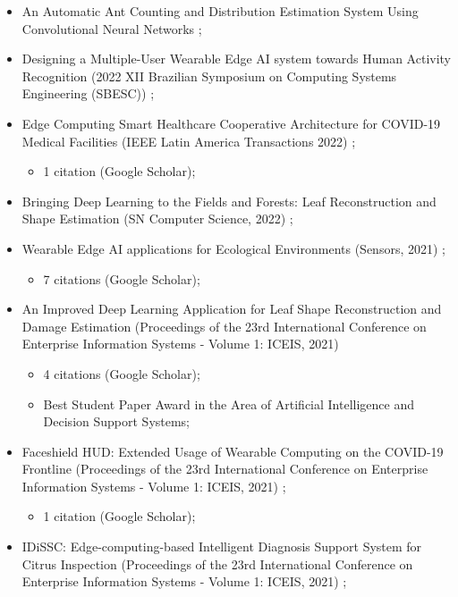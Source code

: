 \begin{itemize}
    \item An Automatic Ant Counting and Distribution Estimation System Using Convolutional Neural Networks \cite{Silva2023iceis};
    \item Designing a Multiple-User Wearable Edge AI system towards Human Activity Recognition (2022 XII Brazilian Symposium on Computing Systems Engineering (SBESC)) \cite{silva2022designing};
    \item Edge Computing Smart Healthcare Cooperative Architecture for COVID-19 Medical Facilities (IEEE Latin America Transactions 2022) \cite{silva2022edge};
    \begin{itemize}
        \item 1 citation (Google Scholar);
    \end{itemize}
    \item Bringing Deep Learning to the Fields and Forests: Leaf Reconstruction and Shape Estimation (SN Computer Science, 2022) \cite{silva2022bringing}; 
    \item Wearable Edge AI applications for Ecological Environments (Sensors, 2021) \cite{silva2021wearable};
    \begin{itemize}
        \item 7 citations (Google Scholar);
    \end{itemize}
    \item An Improved Deep Learning Application for Leaf Shape Reconstruction and Damage Estimation (Proceedings of the 23rd International Conference on Enterprise Information Systems - Volume 1: ICEIS, 2021) \cite{iceis21leaf}
    \begin{itemize}
        \item 4 citations (Google Scholar);
        \item Best Student Paper Award in the Area of Artificial Intelligence and Decision Support Systems;
    \end{itemize}
    \item Faceshield HUD: Extended Usage of Wearable Computing on the COVID-19 Frontline (Proceedings of the 23rd International Conference on Enterprise Information Systems - Volume 1: ICEIS, 2021) \cite{iceis21faceshield};
    \begin{itemize}
        \item 1 citation (Google Scholar);
    \end{itemize}
    \item IDiSSC: Edge-computing-based Intelligent Diagnosis Support System for Citrus Inspection (Proceedings of the 23rd International Conference on Enterprise Information Systems - Volume 1: ICEIS, 2021) \cite{iceis21orange};

\end{itemize}
